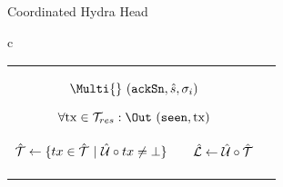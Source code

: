 \begin{figure*}[t!]
\begin{algobox}{Coordinated Hydra Head}
\begin{tabular}{c}
\begin{tabular}{c@{}c}
{\begin{walgo}{0.65}
{{{                $\Multi{}~(\hpAS,\hats,\msSig_i)$ \; %

                $\forall \tx \in \mT_{res}: \Out~(\hpSeen,\tx)$ \; %

                \textcolor{blue}{
                  $\hat {\mathcal T} \gets \{ tx \in \hat {\mathcal T} ~  | ~ \hat {\mathcal U} \circ tx \not = \bot \}$ \ \mf{flat}\ \; %
                  $\hat {\mathcal L} \gets \hat {\mathcal U}\circ\hat {\mathcal T}$
                }
              }
            }
           }
          
        \end{walgo}
        }
        &

        \adjustbox{valign=t,scale=\sfact}{
        \begin{walgo}{0.6}
          \On{$(\hpAS,s,\msSig_j)$ from $\party_j$}{ %

            \Req{} $s \in \{\hats,\hats+1\}$
            \; %

            \Wait{$\hats=s$
            }{ %
            
            \Req{} $(j, \cdot) \notin \hatSigma$ \; %

            $\hatSigma \gets \hatSigma \cup (j,\msSig_j)$ \; %

            \If{$\forall k \in [1..n]: (k,\cdot) \in \hatSigma$}{ %
              $\msCSig \gets \msComb(\hydraKeys, \hatSigma)$ \; %

              $\eta' \gets (\hats, \combine(\hatmU))$ \; %
              \Req{} $\msVfy(\hydraKeysAgg, (\cid || \eta_{0} || \eta'), \msCSig)$ \;
              $\barmU \gets \hatmU$ \; %
              $\bars \gets \hats$ \; %
              $\barsigma \gets \msCSig$ \; %

              $\forall \tx \in \mT_{res} : \Out (\hpConf,\tx)$ \; %

              \If{$\hats = \bars \land \hpLdr(\bars + 1) = i$}{%
                \mf{What if $\hatmT$ empty?}
              
                \Multi{} $(\hpRS,\bars+1,\hatmT^{\downarrow1})$ \;%
              }
            }
          } }
        \end{walgo}

          }

      \end{tabular}

      \\
      \\


\end{tabular}
\end{algobox}
\end{figure*}
